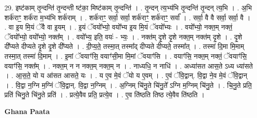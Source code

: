 \documentclass[17pt]{extarticle}
\begin{document}
29. इष्ट॑काम् तृ॒न्दन्ति॑ तृ॒न्दन्ती ष्ट॑का॒ मिष्ट॑काम् तृ॒न्दन्ति॑ । . तृ॒न्दन् त्य॒भ्य॑भि तृ॒न्दन्ति॑ तृ॒न्दन् त्य॒भि । . अ॒भि शर्क॑राꣳ॒॒ शर्क॑रा म॒भ्य॑भि शर्क॑राम् । . शर्क॑राꣳ॒॒ सर्वा॒ सर्वा॒ शर्क॑राꣳ॒॒ शर्क॑राꣳ॒॒ सर्वा᳚ । . सर्वा॒ वै वै सर्वा॒ सर्वा॒ वै । . वा इ॒य मि॒यं ॅवै वा इ॒यम् । . इ॒यं ॅवयो᳚भ्यो॒ वयो᳚भ्य इ॒य मि॒यं ॅवयो᳚भ्यः । . वयो᳚भ्यो॒ नक्त॒म् नक्तं॒ ॅवयो᳚भ्यो॒ वयो᳚भ्यो॒ नक्त᳚म् । . वयो᳚भ्य॒ इति॒ वयः॑ - भ्यः॒ । . नक्त॑म् दृ॒शे दृ॒शे नक्त॒म् नक्त॑म् दृ॒शे । . दृ॒शे दी᳚प्यते दीप्यते दृ॒शे दृ॒शे दी᳚प्यते । . दी॒प्य॒ते॒ तस्मा॒त् तस्मा᳚द् दीप्यते दीप्यते॒ तस्मा᳚त् । . तस्मा॑ दि॒मा मि॒माम् तस्मा॒त् तस्मा॑ दि॒माम् । . इ॒मां ॅवयाꣳ॑सि॒ वयाꣳ॑सी॒मा मि॒मां ॅवयाꣳ॑सि । . वयाꣳ॑सि॒ नक्त॒म् नक्तं॒ ॅवयाꣳ॑सि॒ वयाꣳ॑सि॒ नक्त᳚म् । . नक्त॒म् न न नक्त॒म् नक्त॒म् न । . नाध्यधि॒ न नाधि॑ । . अध्या॑सत आस॒ते ऽध्य ध्या॑सते । . आ॒स॒ते॒ यो य आ॑सत आसते॒ यः । . य ए॒व मे॒वं ॅयो य ए॒वम् । . ए॒वं ॅवि॒द्वान्. वि॒द्वा ने॒व मे॒वं ॅवि॒द्वान् । . वि॒द्वा न॒ग्नि म॒ग्निं ॅवि॒द्वान्. वि॒द्वा न॒ग्निम् । . अ॒ग्निम् चि॑नु॒ते चि॑नु॒ते᳚ ऽग्नि म॒ग्निम् चि॑नु॒ते । . चि॒नु॒ते प्रति॒ प्रति॑ चिनु॒ते चि॑नु॒ते प्रति॑ । . प्रत्ये॒वैव प्रति॒ प्रत्ये॒व । . ए॒व ति॑ष्ठति तिष्ठ त्ये॒वैव ति॑ष्ठति । \newline

\textbf{Ghana Paata } \newline
\end{document}
